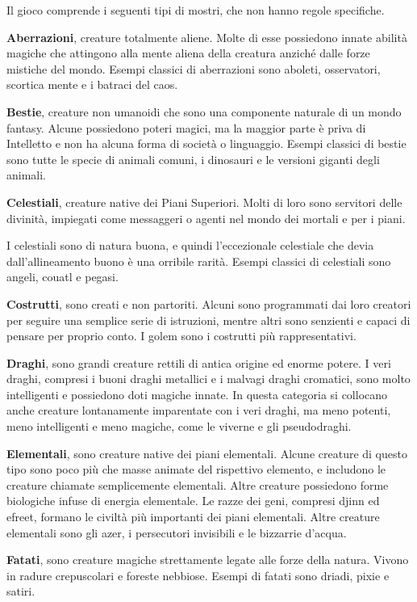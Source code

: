 \begin{multicols}{2}
Il gioco comprende i seguenti tipi di mostri, che non hanno regole
specifiche.

\textbf{Aberrazioni}, creature totalmente aliene. Molte di esse
possiedono innate abilità magiche che attingono alla mente aliena della
creatura anziché dalle forze mistiche del mondo. Esempi classici di
aberrazioni sono aboleti, osservatori, scortica mente e i batraci del
caos.

\textbf{Bestie}, creature non umanoidi che sono una componente naturale
di un mondo fantasy. Alcune possiedono poteri magici, ma la maggior
parte è priva di Intelletto e non ha alcuna forma di società o
linguaggio. Esempi classici di bestie sono tutte le specie di animali
comuni, i dinosauri e le versioni giganti degli animali.

\textbf{Celestiali}, creature native dei Piani Superiori. Molti di loro
sono servitori delle divinità, impiegati come messaggeri o agenti nel
mondo dei mortali e per i piani.

I celestiali sono di natura buona, e quindi l'eccezionale celestiale che
devia dall'allineamento buono è una orribile rarità. Esempi classici di
celestiali sono angeli, couatl e pegasi.

\textbf{Costrutti}, sono creati e non partoriti. Alcuni sono programmati
dai loro creatori per seguire una semplice serie di istruzioni, mentre
altri sono senzienti e capaci di pensare per proprio conto. I golem sono
i costrutti più rappresentativi.

\textbf{Draghi}, sono grandi creature rettili di antica origine ed
enorme potere. I veri draghi, compresi i buoni draghi metallici e i
malvagi draghi cromatici, sono molto intelligenti e possiedono doti
magiche innate. In questa categoria si collocano anche creature
lontanamente imparentate con i veri draghi, ma meno potenti, meno
intelligenti e meno magiche, come le viverne e gli pseudodraghi.

\textbf{Elementali}, sono creature native dei piani elementali. Alcune
creature di questo tipo sono poco più che masse animate del rispettivo
elemento, e includono le creature chiamate semplicemente elementali.
Altre creature possiedono forme biologiche infuse di energia elementale.
Le razze dei geni, compresi djinn ed efreet, formano le civiltà più
importanti dei piani elementali. Altre creature elementali sono gli
azer, i persecutori invisibili e le bizzarrie d'acqua.

\textbf{Fatati}, sono creature magiche strettamente legate alle forze
della natura. Vivono in radure crepuscolari e foreste nebbiose. Esempi
di fatati sono driadi, pixie e satiri.


\end{multicols}
